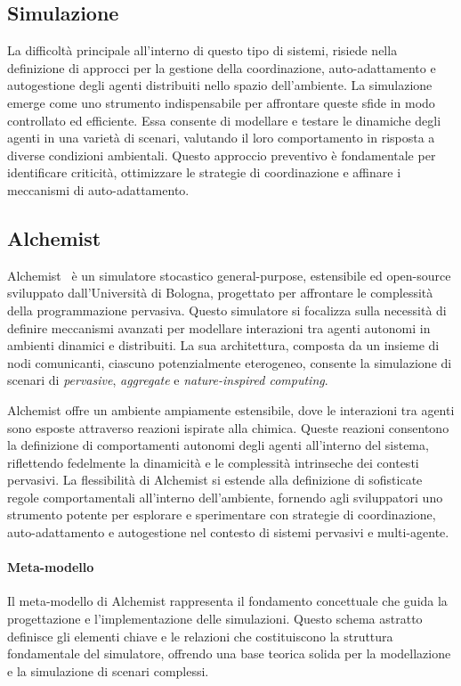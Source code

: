 \subsection{Simulazione}\label{ssec:simulation}
La difficoltà principale all'interno di questo tipo di sistemi, risiede nella definizione di approcci per la gestione della coordinazione, auto-adattamento
e autogestione degli agenti distribuiti nello spazio dell'ambiente. 
La simulazione emerge come uno strumento indispensabile per affrontare queste sfide in modo controllato ed efficiente. Essa consente di modellare e testare
le dinamiche degli agenti in una varietà di scenari, valutando il loro comportamento in risposta a diverse condizioni ambientali. Questo approccio
preventivo è fondamentale per identificare criticità, ottimizzare le strategie di coordinazione e affinare i meccanismi di auto-adattamento.

\subsection{Alchemist}\label{ssec:alchemist}
Alchemist~\cite{alchemist} è un simulatore stocastico general-purpose, estensibile ed open-source sviluppato dall'Università di Bologna, progettato
per affrontare le complessità della programmazione pervasiva. Questo simulatore si focalizza sulla necessità di definire meccanismi avanzati per modellare
interazioni tra agenti autonomi in ambienti dinamici e distribuiti. La sua architettura, composta da un insieme di nodi comunicanti, ciascuno
potenzialmente eterogeneo, consente la simulazione di scenari di \textit{pervasive}, \textit{aggregate} e \textit{nature-inspired computing}.

Alchemist offre un ambiente ampiamente estensibile, dove le interazioni tra agenti sono esposte attraverso reazioni ispirate alla chimica. Queste reazioni
consentono la definizione di comportamenti autonomi degli agenti all'interno del sistema, riflettendo fedelmente la dinamicità e le complessità intrinseche
dei contesti pervasivi. La flessibilità di Alchemist si estende alla definizione di sofisticate regole comportamentali all'interno dell'ambiente,
fornendo agli sviluppatori uno strumento potente per esplorare e sperimentare con strategie di coordinazione, auto-adattamento e autogestione nel contesto di
sistemi pervasivi e multi-agente.

\paragraph{Meta-modello} Il meta-modello di Alchemist rappresenta il fondamento concettuale che guida la progettazione e l'implementazione delle simulazioni. Questo
schema astratto definisce gli elementi chiave e le relazioni che costituiscono la struttura fondamentale del simulatore, offrendo una base teorica solida per
la modellazione e la simulazione di scenari complessi.

